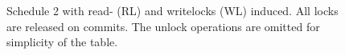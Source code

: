 \begin{figure}[H]
\footnotesize
\centering

\caption{Schedule 2 with read- (RL) and writelocks (WL) induced. All locks are
released on commits. The unlock operations are omitted for simplicity of the
table.}
\label{fig:schedule2-2pl}
\end{figure}
